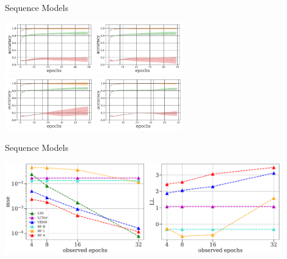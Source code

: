 \begin{frame}{Sequence Models {}}


\begin{center}
	\includegraphics[width=0.58\textwidth]{../w07_hpo_speedup/images/learningcurve/Gargiani-MNIST-extrapolations_1.png}\\
	\includegraphics[width=0.58\textwidth]{../w07_hpo_speedup/images/learningcurve/Gargiani-MNIST-extrapolations_2.png}\\
\end{center}	
	
\end{frame}
\begin{frame}{Sequence Models {}}

\begin{center}
	\includegraphics[width=0.9\textwidth]{../w07_hpo_speedup/images/learningcurve/Gargiani-MNIST-extrapolation-quality-based-on-different-sized-prefixes.png}
\end{center}	
\end{frame}
